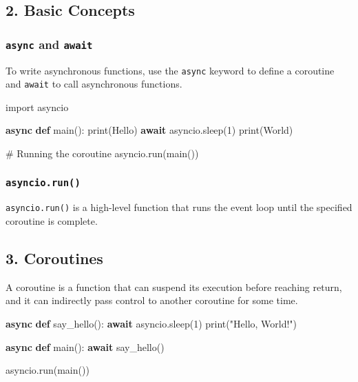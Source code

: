 \documentclass[
  letterpaper,
  DIV=11,
  numbers=noendperiod]{scrreprt}
\newenvironment{Shaded}{\begin{snugshade}}{\end{snugshade}}
\newcommand{\BuiltInTok}[1]{\textcolor[rgb]{0.00,0.23,0.31}{#1}}
\newcommand{\CommentTok}[1]{\textcolor[rgb]{0.37,0.37,0.37}{#1}}
\newcommand{\ControlFlowTok}[1]{\textcolor[rgb]{0.00,0.23,0.31}{\textbf{#1}}}
\newcommand{\DecValTok}[1]{\textcolor[rgb]{0.68,0.00,0.00}{#1}}
\newcommand{\ImportTok}[1]{\textcolor[rgb]{0.00,0.46,0.62}{#1}}
\newcommand{\KeywordTok}[1]{\textcolor[rgb]{0.00,0.23,0.31}{\textbf{#1}}}
\newcommand{\NormalTok}[1]{\textcolor[rgb]{0.00,0.23,0.31}{#1}}
\newcommand{\StringTok}[1]{\textcolor[rgb]{0.13,0.47,0.30}{#1}}
\begin{document}
\subsection{2. Basic Concepts}\label{basic-concepts}

\subsubsection{\texorpdfstring{\texttt{async} and
\texttt{await}}{async and await}}\label{async-and-await}

To write asynchronous functions, use the \texttt{async} keyword to
define a coroutine and \texttt{await} to call asynchronous functions.

\begin{Shaded}
\begin{Highlighting}[]
\ImportTok{import}\NormalTok{ asyncio}

\ControlFlowTok{async} \KeywordTok{def}\NormalTok{ main():}
    \BuiltInTok{print}\NormalTok{(}\StringTok{\textquotesingle{}Hello\textquotesingle{}}\NormalTok{)}
    \ControlFlowTok{await}\NormalTok{ asyncio.sleep(}\DecValTok{1}\NormalTok{)}
    \BuiltInTok{print}\NormalTok{(}\StringTok{\textquotesingle{}World\textquotesingle{}}\NormalTok{)}

\CommentTok{\# Running the coroutine}
\NormalTok{asyncio.run(main())}
\end{Highlighting}
\end{Shaded}

\subsubsection{\texorpdfstring{\texttt{asyncio.run()}}{asyncio.run()}}\label{asyncio.run}

\texttt{asyncio.run()} is a high-level function that runs the event loop
until the specified coroutine is complete.

\subsection{3. Coroutines}\label{coroutines}

A coroutine is a function that can suspend its execution before reaching
return, and it can indirectly pass control to another coroutine for some
time.

\begin{Shaded}
\begin{Highlighting}[]
\ControlFlowTok{async} \KeywordTok{def}\NormalTok{ say\_hello():}
    \ControlFlowTok{await}\NormalTok{ asyncio.sleep(}\DecValTok{1}\NormalTok{)}
    \BuiltInTok{print}\NormalTok{(}\StringTok{"Hello, World!"}\NormalTok{)}

\ControlFlowTok{async} \KeywordTok{def}\NormalTok{ main():}
    \ControlFlowTok{await}\NormalTok{ say\_hello()}

\NormalTok{asyncio.run(main())}
\end{Highlighting}
\end{Shaded}
\end{document}
